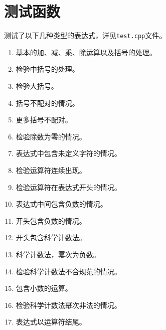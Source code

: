 \documentclass[UTF8]{ctexart}
\begin{document}
\section{测试函数}
测试了以下几种类型的表达式，详见\texttt{test.cpp}文件。
\begin{enumerate}
    \item 基本的加、减、乘、除运算以及括号的处理。
    \item 检验中括号的处理。
    \item 检验大括号。
    \item 括号不配对的情况。
    \item 更多括号不配对。
    \item 检验除数为零的情况。
    \item 表达式中包含未定义字符的情况。
    \item 检验运算符连续出现。
    \item 检验运算符在表达式开头的情况。
    \item 表达式中间包含负数的情况。
    \item 开头包含负数的情况。
    \item 开头包含科学计数法。
    \item 科学计数法，幂次为负数。
    \item 检验科学计数法不合规范的情况。
    \item 包含小数的运算。
    \item 检验科学计数法幂次非法的情况。
    \item 表达式以运算符结尾。
\end{enumerate}
\clearpage
\end{document}
